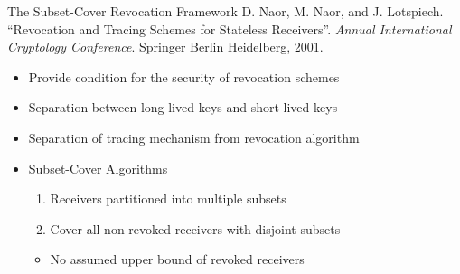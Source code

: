 \documentclass[10pt]{beamer}
\begin{document}
\begin{frame}{The Subset-Cover Revocation Framework}
D. Naor, M. Naor, and J. Lotspiech. ``Revocation and
Tracing Schemes for Stateless Receivers''. \textit{Annual International Cryptology Conference}. Springer Berlin Heidelberg, 2001.

  \begin{itemize}
    \item Provide condition for the security of revocation schemes
    \item Separation between long-lived keys and short-lived keys
    \item Separation of tracing mechanism from revocation algorithm
    \item \alert{Subset-Cover Algorithms}
    \pause
    \begin{enumerate}
      \item Receivers partitioned into multiple subsets
      \item Cover all non-revoked receivers with disjoint subsets
    \end{enumerate}
    \vspace{-0.5em}
    \begin{itemize}
      \item No assumed upper bound of revoked receivers
    \end{itemize}
  \end{itemize}

\end{frame}
\end{document}
